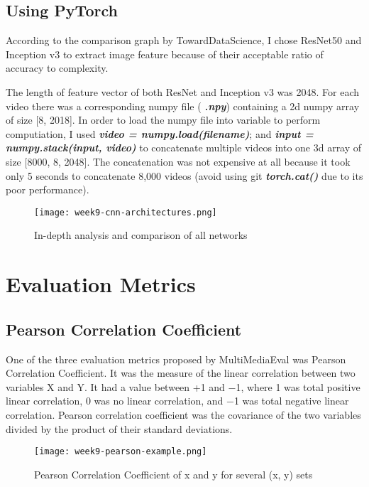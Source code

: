 \subsection{Using PyTorch}
According to the comparison graph by TowardDataScience, I chose ResNet50 and Inception v3 to extract image feature because of their acceptable ratio of accuracy to complexity.

The length of feature vector of both ResNet and Inception v3 was 2048. For each video there was a corresponding numpy file ( \textbf{\emph{.npy}}) containing a 2d numpy array of size [8, 2018]. In order to load the numpy file into variable to perform computiation, I used \textbf{\emph{video = numpy.load(filename)}}; and \textbf{\emph{input = numpy.stack(input, video)}} to concatenate multiple videos into one 3d array of size [8000, 8, 2048]. The concatenation was not expensive at all because it took only 5 seconds to concatenate 8,000 videos (avoid using git \textbf{\emph{torch.cat()}} due to its poor performance).

\newpage
\begin{figure}[!ht]
\centering
\texttt{[image: week9-cnn-architectures.png]}
\caption{In-depth analysis and comparison of all networks\cite{cnnarchitectures}}
\end{figure}

\section{Evaluation Metrics}
\subsection{Pearson Correlation Coefficient}
One of the three evaluation metrics proposed by MultiMediaEval was Pearson Correlation Coefficient. It was the measure of the linear correlation between two variables X and Y. It had a value between +1 and −1, where 1 was total positive linear correlation, 0 was no linear correlation, and −1 was total negative linear correlation. Pearson correlation coefficient was the covariance of the two variables divided by the product of their standard deviations.

\begin{figure}[!ht]
\centering
\texttt{[image: week9-pearson-example.png]}
\caption{Pearson Correlation Coefficient of x and y for several (x, y) sets}
\end{figure}

